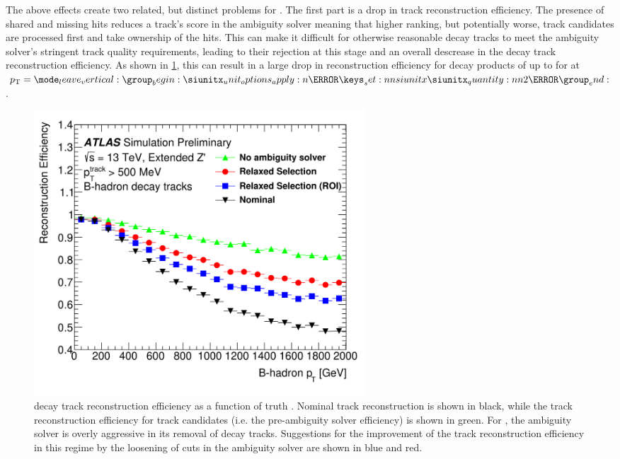 The above effects create two related, but distinct problems for \btagging.
The first part is a drop in track reconstruction efficiency.
The presence of shared and missing hits reduces a track's score in the ambiguity solver meaning that higher ranking, but potentially worse, track candidates are processed first and take ownership of the hits.
This can make it difficult for otherwise reasonable \bhadron decay tracks to meet the ambiguity solver's stringent track quality requirements, leading to their rejection at this stage and an overall descrease in the \bhadron decay track reconstruction efficiency.
As shown in \cref{fig:b_track_eff}, this can result in a large drop in reconstruction efficiency for \bhadron decay products of up to  for at $\pt = \SI{2}{\TeV}$.

\begin{figure}[!htbp]
  \centering
  \includegraphics[width=0.6\textwidth]{chapters/3.tracking/figs/b_track_reco_eff.png}
  \caption{
    \bhadron decay track reconstruction efficiency as a function of truth \bhadron \pt \cite{2022DonalTrackReco}.
    Nominal track reconstruction is shown in black, while the track reconstruction efficiency for track candidates (i.e. the pre-ambiguity solver efficiency) is shown in green.
    For \highpt \bhadrons, the ambiguity solver is overly aggressive in its removal of \bhadron decay tracks.
    Suggestions for the improvement of the track reconstruction efficiency in this regime by the loosening of cuts in the ambiguity solver are shown in blue and red.
  }
  \label{fig:b_track_eff}
\end{figure}

